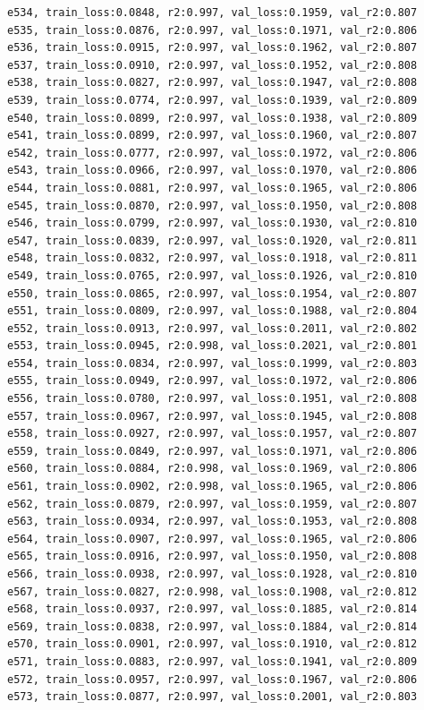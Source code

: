 \documentclass[a4paper, 12pt]{article}
\begin{document}
\begin{lstlisting}
e534, train_loss:0.0848, r2:0.997, val_loss:0.1959, val_r2:0.807
e535, train_loss:0.0876, r2:0.997, val_loss:0.1971, val_r2:0.806
e536, train_loss:0.0915, r2:0.997, val_loss:0.1962, val_r2:0.807
e537, train_loss:0.0910, r2:0.997, val_loss:0.1952, val_r2:0.808
e538, train_loss:0.0827, r2:0.997, val_loss:0.1947, val_r2:0.808
e539, train_loss:0.0774, r2:0.997, val_loss:0.1939, val_r2:0.809
e540, train_loss:0.0899, r2:0.997, val_loss:0.1938, val_r2:0.809
e541, train_loss:0.0899, r2:0.997, val_loss:0.1960, val_r2:0.807
e542, train_loss:0.0777, r2:0.997, val_loss:0.1972, val_r2:0.806
e543, train_loss:0.0966, r2:0.997, val_loss:0.1970, val_r2:0.806
e544, train_loss:0.0881, r2:0.997, val_loss:0.1965, val_r2:0.806
e545, train_loss:0.0870, r2:0.997, val_loss:0.1950, val_r2:0.808
e546, train_loss:0.0799, r2:0.997, val_loss:0.1930, val_r2:0.810
e547, train_loss:0.0839, r2:0.997, val_loss:0.1920, val_r2:0.811
e548, train_loss:0.0832, r2:0.997, val_loss:0.1918, val_r2:0.811
e549, train_loss:0.0765, r2:0.997, val_loss:0.1926, val_r2:0.810
e550, train_loss:0.0865, r2:0.997, val_loss:0.1954, val_r2:0.807
e551, train_loss:0.0809, r2:0.997, val_loss:0.1988, val_r2:0.804
e552, train_loss:0.0913, r2:0.997, val_loss:0.2011, val_r2:0.802
e553, train_loss:0.0945, r2:0.998, val_loss:0.2021, val_r2:0.801
e554, train_loss:0.0834, r2:0.997, val_loss:0.1999, val_r2:0.803
e555, train_loss:0.0949, r2:0.997, val_loss:0.1972, val_r2:0.806
e556, train_loss:0.0780, r2:0.997, val_loss:0.1951, val_r2:0.808
e557, train_loss:0.0967, r2:0.997, val_loss:0.1945, val_r2:0.808
e558, train_loss:0.0927, r2:0.997, val_loss:0.1957, val_r2:0.807
e559, train_loss:0.0849, r2:0.997, val_loss:0.1971, val_r2:0.806
e560, train_loss:0.0884, r2:0.998, val_loss:0.1969, val_r2:0.806
e561, train_loss:0.0902, r2:0.998, val_loss:0.1965, val_r2:0.806
e562, train_loss:0.0879, r2:0.997, val_loss:0.1959, val_r2:0.807
e563, train_loss:0.0934, r2:0.997, val_loss:0.1953, val_r2:0.808
e564, train_loss:0.0907, r2:0.997, val_loss:0.1965, val_r2:0.806
e565, train_loss:0.0916, r2:0.997, val_loss:0.1950, val_r2:0.808
e566, train_loss:0.0938, r2:0.997, val_loss:0.1928, val_r2:0.810
e567, train_loss:0.0827, r2:0.998, val_loss:0.1908, val_r2:0.812
e568, train_loss:0.0937, r2:0.997, val_loss:0.1885, val_r2:0.814
e569, train_loss:0.0838, r2:0.997, val_loss:0.1884, val_r2:0.814
e570, train_loss:0.0901, r2:0.997, val_loss:0.1910, val_r2:0.812
e571, train_loss:0.0883, r2:0.997, val_loss:0.1941, val_r2:0.809
e572, train_loss:0.0957, r2:0.997, val_loss:0.1967, val_r2:0.806
e573, train_loss:0.0877, r2:0.997, val_loss:0.2001, val_r2:0.803

\end{lstlisting}
\end{document}
